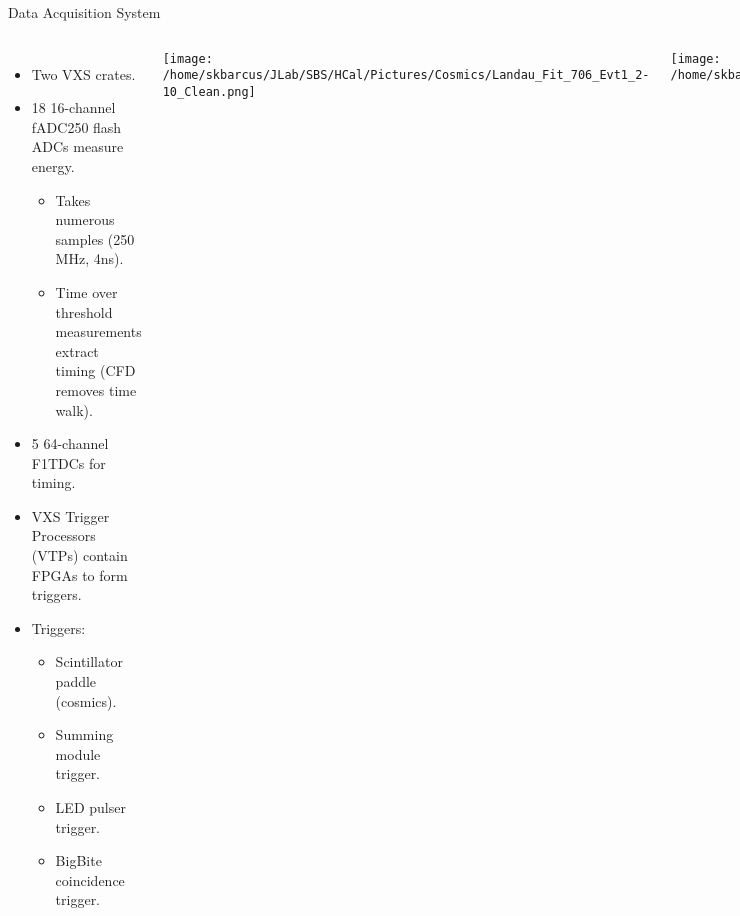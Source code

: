 \documentclass[10pt]{beamer}
\begin{document}
\begin{frame}{Data Acquisition System}

    \begin{columns}[T,onlytextwidth]
  	
  	\begin{itemize}
  		\item Two VXS crates.
  		\item 18 16-channel fADC250 flash ADCs measure energy.
  			\begin{itemize}
  				\item[--] Takes numerous samples (250 MHz, 4ns).
  				\item[--] Time over threshold measurements extract timing (CFD removes time walk).
  			\end{itemize}
  		\item 5 64-channel F1TDCs for timing.
  		\item VXS Trigger Processors (VTPs) contain FPGAs to form triggers.
  		\item \alert{Triggers:}
  			\begin{itemize}
  				\item[--] Scintillator paddle (cosmics).
  				\item[--] Summing module trigger.
  				\item[--] LED pulser trigger.
  				\item[--] BigBite coincidence trigger.
  			\end{itemize}
  	\end{itemize}
  	
	\texttt{[image: /home/skbarcus/JLab/SBS/HCal/Pictures/Cosmics/Landau\_Fit\_706\_Evt1\_2-10\_Clean.png]}
	
\vspace{10mm}	
	
	\texttt{[image: /home/skbarcus/JLab/SBS/HCal/Pictures/Cosmics/Cosmic\_Hit\_run820\_evt16\_Arrow.png]}

	\end{columns}

\end{frame}
\end{document}

